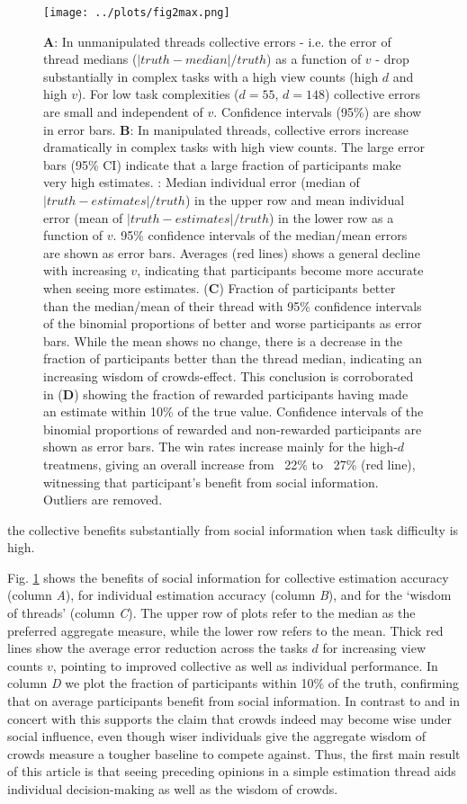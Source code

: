 \documentclass[9pt,twocolumn,twoside,lineno]{article}
\begin{document}
\begin{figure}
\centering
\texttt{[image: ../plots/fig2max.png]}
\caption{\textbf{A}: In unmanipulated threads collective errors - i.e. the error of thread medians ($|truth-median|/truth$) as a function of $v$ - drop substantially in complex tasks with a high view counts (high $d$ and high $v$). For low task complexities ($d=55$, $d=148$) collective errors are small and independent of $v$. Confidence intervals (95\%) are show in error bars. \textbf{B}: In manipulated threads, collective errors increase dramatically in complex tasks with high view counts. The large error bars (95\% CI) indicate that a large fraction of participants make very high estimates. : Median individual error (median of $|truth-estimates|/truth$) in the upper row and mean individual error (mean of $|truth-estimates|/truth$) in the lower row as a function of $v$. 95\% confidence intervals of the median/mean errors are shown as error bars. Averages (red lines) shows a general decline with increasing $v$, indicating that participants become more accurate when seeing more estimates. (\textbf{C}) Fraction of participants better than the median/mean of their thread with 95\% confidence intervals of the binomial proportions of better and worse participants as error bars. While the mean shows no change, there is a decrease in the fraction of participants better than the thread median, indicating an increasing wisdom of crowds-effect. This conclusion is corroborated in (\textbf{D}) showing the fraction of rewarded participants having made an estimate within 10\% of the true value. Confidence intervals of the binomial proportions of rewarded and non-rewarded participants are shown as error bars. The win rates increase mainly for the high-$d$ treatmens, giving an overall increase from ~22\% to ~27\% (red line), witnessing that participant’s benefit from social information. Outliers are removed.}\label{fig:2}
\end{figure}

the collective benefits substantially from social information when task difficulty is high. 


Fig. \ref{fig:2} shows the benefits of social information for collective estimation accuracy (column \textit{A}), for individual estimation accuracy (column \textit{B}), and for the ‘wisdom of threads’ (column \textit{C}). The upper row of plots refer to the median as the preferred aggregate measure, while the lower row refers to the mean. Thick red lines show the average error reduction across the tasks $d$ for increasing view counts $v$, pointing to improved collective as well as individual performance. In column \textit{D} we plot the fraction of participants within 10\% of the truth, confirming that on average participants benefit from social information. In contrast to \cite{lorenz2011social} and in concert with \cite{becker2017network, farrell2011social} this supports the claim that crowds indeed may become wise under social influence, even though wiser individuals give the aggregate wisdom of crowds measure a tougher baseline to compete against. Thus, the first main result of this article is that seeing preceding opinions in a simple estimation thread aids individual decision-making as well as the wisdom of crowds.
\end{document}
